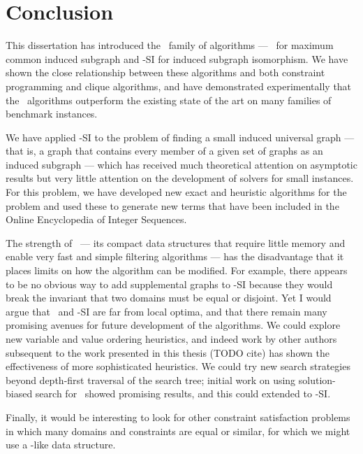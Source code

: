 \chapter{Conclusion}
\label{c:conclusion}

This dissertation has introduced the \McSplit\ family of algorithms ---
\McSplit\ for maximum common induced subgraph and \McSplit-SI for induced
subgraph isomorphism.  We have shown the close relationship between these
algorithms and both constraint programming and clique algorithms, and have
demonstrated experimentally that the \McSplit\ algorithms outperform the
existing state of the art on many families of benchmark instances.

We have applied \McSplit-SI to the problem of finding a small induced universal
graph --- that is, a graph that contains every member of a given set of graphs
as an induced subgraph --- which has received much theoretical attention on
asymptotic results but very little attention on the development of solvers for
small instances.  For this problem, we have developed new exact and heuristic
algorithms for the problem and used these to generate new terms that have been
included in the Online Encyclopedia of Integer Sequences.

The strength of \McSplit\ --- its compact data structures that require little
memory and enable very fast and simple filtering algorithms --- has the
disadvantage that it places limits on how the algorithm can be modified.  For example, there
appears to be no obvious way to add supplemental graphs to \McSplit-SI because
they would break the invariant that two domains must be equal or disjoint.  Yet
I would argue that \McSplit\ and \McSplit-SI are far from local optima, and
that there remain many promising avenues for future development of the
algorithms.  We could explore new variable and value ordering heuristics, and
indeed work by other authors subsequent to the work presented in this thesis
(TODO cite) has shown the effectiveness of more sophisticated heuristics.  We
could try new search strategies beyond depth-first traversal of the search
tree; initial work on using solution-biased search for \McSplit\ showed
promising results, and this could extended to \McSplit-SI.

Finally, it would be interesting to look for other constraint satisfaction
problems in which many domains and constraints are equal or similar, for which
we might use a \McSplit-like data structure.
